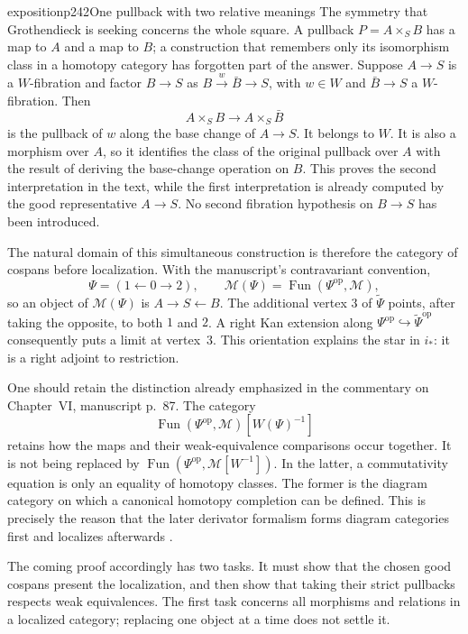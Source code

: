 \begin{dcomment}{exposition}{p242}{One pullback with two relative meanings}
The symmetry that Grothendieck is seeking concerns the whole square. A pullback $P=A\times_S B$ has a map to $A$ and a map to $B$; a construction that remembers only its isomorphism class in a homotopy category has forgotten part of the answer. Suppose $A\to S$ is a $W$-fibration and factor $B\to S$ as $B\xrightarrow{w}\bar B\to S$, with $w\in W$ and $\bar B\to S$ a $W$-fibration. Then
\[
 A\times_S B\longrightarrow A\times_S\bar B
\]
is the pullback of $w$ along the base change of $A\to S$. It belongs to $W$. It is also a morphism over $A$, so it identifies the class of the original pullback over $A$ with the result of deriving the base-change operation on $B$. This proves the second interpretation in the text, while the first interpretation is already computed by the good representative $A\to S$. No second fibration hypothesis on $B\to S$ has been introduced.

The natural domain of this simultaneous construction is therefore the category of cospans before localization. With the manuscript's contravariant convention,
\[
 \Psi=(1\leftarrow0\to2),\qquad
 \mathcal M(\Psi)=\operatorname{Fun}(\Psi^{\mathrm{op}},\mathcal M),
\]
so an object of $\mathcal M(\Psi)$ is $A\to S\leftarrow B$. The additional vertex $3$ of $\tilde\Psi$ points, after taking the opposite, to both $1$ and $2$. A right Kan extension along $\Psi^{\mathrm{op}}\hookrightarrow\tilde\Psi^{\mathrm{op}}$ consequently puts a limit at vertex~$3$. This orientation explains the star in $i_*$: it is a right adjoint to restriction.

One should retain the distinction already emphasized in the commentary on Chapter~VI, manuscript p.~87. The category
\[
 \operatorname{Fun}(\Psi^{\mathrm{op}},\mathcal M)[W(\Psi)^{-1}]
\]
retains how the maps and their weak-equivalence comparisons occur together. It is not being replaced by $\operatorname{Fun}(\Psi^{\mathrm{op}},\mathcal M[W^{-1}])$. In the latter, a commutativity equation is only an equality of homotopy classes. The former is the diagram category on which a canonical homotopy completion can be defined. This is precisely the reason that the later derivator formalism forms diagram categories first and localizes afterwards \citep[pp.~313--315]{Groth2013}.

The coming proof accordingly has two tasks. It must show that the chosen good cospans present the localization, and then show that taking their strict pullbacks respects weak equivalences. The first task concerns all morphisms and relations in a localized category; replacing one object at a time does not settle it.
\end{dcomment}


